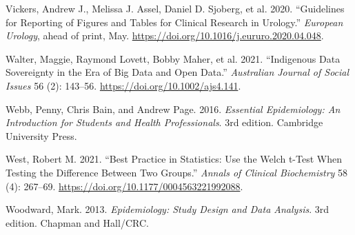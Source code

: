 \documentclass[
  a4paper,
]{memoir}
\newlength{\cslhangindent}
\newenvironment{CSLReferences}[2] %
 {\begin{list}{}{%
  \setlength{\itemindent}{0pt}
  \setlength{\leftmargin}{0pt}
  \setlength{\parsep}{0pt}
  \ifodd #1
   \setlength{\leftmargin}{\cslhangindent}
   \setlength{\itemindent}{-1\cslhangindent}
  \fi
  \setlength{\itemsep}{#2\baselineskip}}}
 {\end{list}}
\begin{document}
\begin{CSLReferences}{1}{1}
Vickers, Andrew J., Melissa J. Assel, Daniel D. Sjoberg, et al. 2020.
{``Guidelines for {Reporting} of {Figures} and {Tables} for {Clinical
Research} in {Urology}.''} \emph{European Urology}, ahead of print, May.
\url{https://doi.org/10.1016/j.eururo.2020.04.048}.

Walter, Maggie, Raymond Lovett, Bobby Maher, et al. 2021. {``Indigenous
{Data Sovereignty} in the {Era} of {Big Data} and {Open Data}.''}
\emph{Australian Journal of Social Issues} 56 (2): 143--56.
\url{https://doi.org/10.1002/ajs4.141}.

Webb, Penny, Chris Bain, and Andrew Page. 2016. \emph{Essential
{Epidemiology}: {An Introduction} for {Students} and {Health
Professionals}}. 3rd edition. Cambridge University Press.

West, Robert M. 2021. {``Best Practice in Statistics: {Use} the {Welch}
t-Test When Testing the Difference Between Two Groups.''} \emph{Annals
of Clinical Biochemistry} 58 (4): 267--69.
\url{https://doi.org/10.1177/0004563221992088}.

Woodward, Mark. 2013. \emph{Epidemiology: {Study Design} and {Data
Analysis}}. 3rd edition. {Chapman and Hall/CRC}.

\end{CSLReferences}


\backmatter
\end{document}
